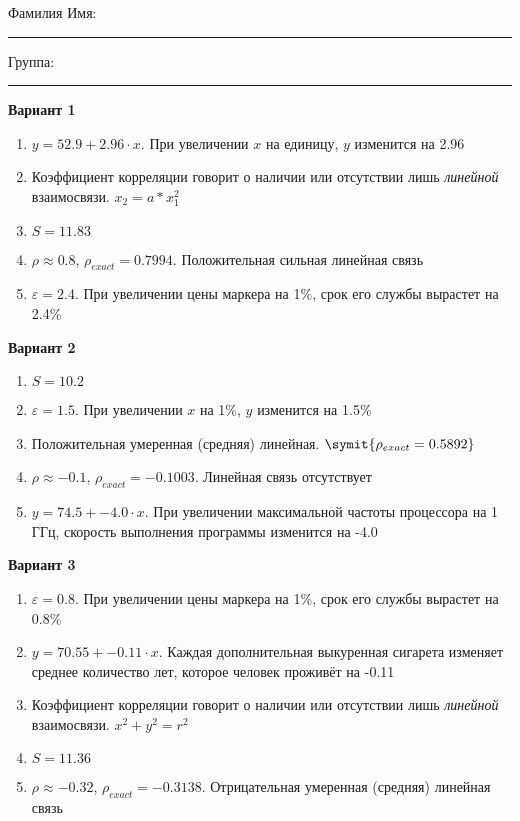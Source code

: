 \documentclass{article}
\begin{document}
\mbox{}

\vspace{-36pt}

\begin{center}
	\begin{tcolorbox}[colback=white, boxrule=0.20ex, sharp corners = all, height=25pt, colframe=black, valign=top]
		\begin{center}
			Фамилия Имя:\hspace{1.5pt}\rule{190pt}{0pt}\hspace{50pt}Группа:\hspace{1.5pt}\rule{60pt}{0pt}
		\end{center}
	\end{tcolorbox}
\end{center}
\vspace{3pt}

\textbf{Вариант 1}
\begin{enumerate}
\item $y = 52.9+2.96\cdot x$. При увеличении $x$ на единицу, $y$ изменится на 2.96
\item Коэффициент корреляции говорит о наличии или отсутствии лишь \textit{линейной} взаимосвязи. $x_2 = a * x_1 ^ 2$  
\item $S = 11.83$
\item $\rho \approx 0.8$, $\rho_{exact} = 0.7994$. Положительная сильная линейная связь
\item $\varepsilon = 2.4$. При увеличении цены маркера на 1\%, срок его службы вырастет на 2.4\%
\end{enumerate}

\textbf{Вариант 2}
\begin{enumerate}
\item $S = 10.2$
\item $\varepsilon = 1.5$. При увеличении $x$ на 1\%, $y$ изменится на 1.5\%
\item Положительная умеренная (средняя) линейная. $\symit{\rho_{exact} = 0.5892}$
\item $\rho \approx -0.1$, $\rho_{exact} = -0.1003$. Линейная связь отсутствует
\item $y = 74.5+-4.0\cdot x$. При увеличении максимальной частоты процессора на 1 ГГц, скорость выполнения программы изменится на -4.0
\end{enumerate}

\textbf{Вариант 3}
\begin{enumerate}
\item $\varepsilon = 0.8$. При увеличении цены маркера на 1\%, срок его службы вырастет на 0.8\%
\item $y = 70.55+-0.11\cdot x$. Каждая дополнительная выкуренная сигарета изменяет среднее количество лет, которое человек проживёт на -0.11
\item Коэффициент корреляции говорит о наличии или отсутствии лишь \textit{линейной} взаимосвязи. $x ^ 2 + y ^ 2 = r^2$
\item $S = 11.36$
\item $\rho \approx -0.32$, $\rho_{exact} = -0.3138$. Отрицательная умеренная (средняя) линейная связь
\end{enumerate}
\end{document}
